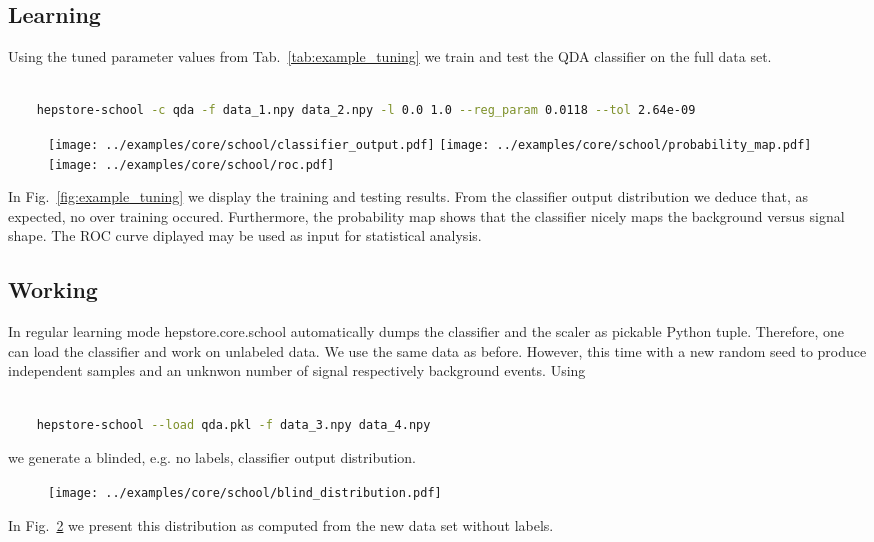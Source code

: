 \subsection{Learning}
Using the tuned parameter values from Tab.~\ref{tab:example_tuning} we
train and test the QDA classifier on the full data set.
%
\begin{changemargin}{1.5cm}{1.5cm} 
  \begin{lstlisting}[language=Bash]
    
    hepstore-school -c qda -f data_1.npy data_2.npy -l 0.0 1.0 --reg_param 0.0118 --tol 2.64e-09
  \end{lstlisting}
\end{changemargin}
%
%
\begin{figure}
  \centering
  \texttt{[image: ../examples/core/school/classifier\_output.pdf]}
  \texttt{[image: ../examples/core/school/probability\_map.pdf]}
  \texttt{[image: ../examples/core/school/roc.pdf]}
  \caption{}
  \label{fig:example_training}
\end{figure}
%
In Fig.~\ref{fig:example_tuning} we display the training and testing
results. From the classifier output distribution we deduce that, as
expected, no over training occured. Furthermore, the probability map
shows that the classifier nicely maps the background versus signal
shape. The ROC curve diplayed may be used as input for statistical
analysis.

\subsection{Working}
In regular learning mode hepstore.core.school automatically dumps the
classifier and the scaler as pickable Python tuple. Therefore, one can
load the classifier and work on unlabeled data. We use the same data
as before. However, this time with a new random seed to produce
independent samples and an unknwon number of signal respectively
background events. Using
%
\begin{changemargin}{1.5cm}{1.5cm} 
  \begin{lstlisting}[language=Bash]
    
    hepstore-school --load qda.pkl -f data_3.npy data_4.npy
  \end{lstlisting}
\end{changemargin}
%
we generate a blinded, e.g. no labels, classifier output distribution.
%
\begin{figure}
  \centering
  \texttt{[image: ../examples/core/school/blind\_distribution.pdf]}
  \caption{}
  \label{fig:example_working}
\end{figure}
%
In Fig.~\ref{fig:example_working} we present this distribution as
computed from the new data set without labels.




